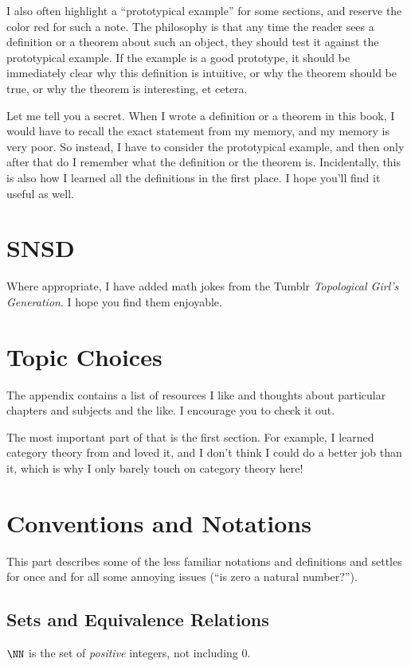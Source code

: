 I also often highlight a ``prototypical example'' for some sections,
and reserve the color red for such a note.
The philosophy is that any time the reader sees a definition or a theorem about such an object, they should test it against the prototypical example.
If the example is a good prototype, it should be immediately clear why this definition is intuitive, or why the theorem should be true, or why the theorem is interesting, et cetera.

Let me tell you a secret.  When I wrote a definition or a theorem in this book, I would have to recall the exact statement from my memory, and my memory is very poor. So instead, I have to consider the prototypical example, and then only after that do I remember what the definition or the theorem is.
Incidentally, this is also how I learned all the definitions in the first place.
I hope you'll find it useful as well.

\section{SNSD}
Where appropriate, I have added math jokes from the
Tumblr \emph{Topological Girl's Generation}.
I hope you find them enjoyable.

\section{Topic Choices}
The appendix contains a list of resources I like and thoughts about
particular chapters and subjects and the like.
I encourage you to check it out.

The most important part of that is the first section.
For example, I learned category theory from \cite{ref:msci} and loved it,
and I don't think I could do a better job than it,
which is why I only barely touch on category theory here!

\section{Conventions and Notations}
This part describes some of the less familiar notations and definitions
and settles for once and for all some annoying issues (``is zero a natural number?'').

\subsection*{Sets and Equivalence Relations}
$\NN$ is the set of \emph{positive} integers, not including $0$.

